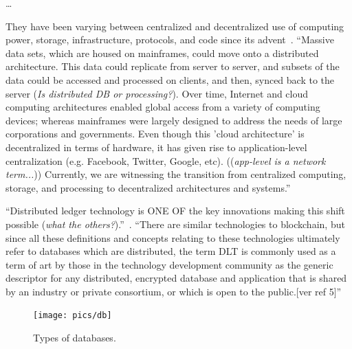 \dots

They
have been varying between centralized and decentralized use of computing power, storage, infrastructure, protocols, and code since its advent~\cite{LFS171x}.
``Massive data sets, which are housed on mainframes, could move onto a distributed architecture. This data could replicate from server to server, and subsets of the data could be accessed and processed on clients, and then, synced back to the server (\textit{Is distributed DB or processing?}).
Over time, Internet and cloud computing architectures enabled global access from a variety of computing devices; whereas mainframes were largely designed to address the needs of large corporations and governments. Even though this 'cloud architecture' is decentralized in terms of hardware, it has given rise to application-level centralization (e.g. Facebook, Twitter, Google, etc). ((\textit{app-level is a network term...}))
Currently, we are witnessing the transition from centralized computing, storage, and processing to decentralized architectures and systems.''~\cite{LFS171x}

``Distributed ledger technology is ONE OF the key innovations making this shift possible (\textit{what the others?}).''~\cite{LFS171x}.
``There are similar technologies to blockchain, but since all these definitions and concepts relating to these technologies ultimately refer to databases which are distributed, the term DLT is commonly used as a term of art by those in the technology development community as the generic descriptor for any distributed, encrypted database and application that is shared by an industry or private consortium, or which is open to the public.[ver ref 5]''~\cite{itu2017}



\begin{figure}[h!tb]{\textwidth}
  \caption{Types of databases.} \label{fig:DBs}
  \texttt{[image: pics/db]}
\end{figure}

